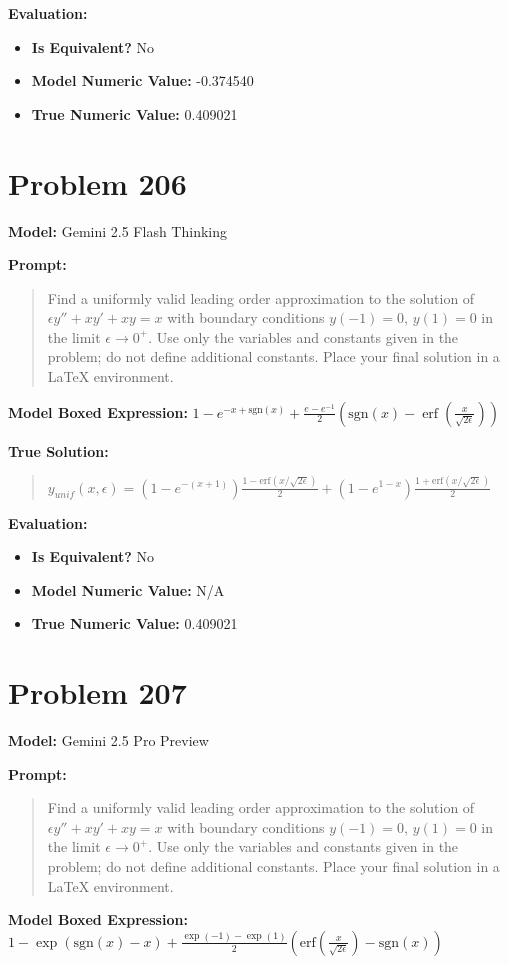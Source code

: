 \documentclass{article}
\begin{document}
{\textbf{Evaluation:}
\begin{itemize}
\item \textbf{Is Equivalent?} No
\item \textbf{Model Numeric Value:} -0.374540
\item \textbf{True Numeric Value:} 0.409021
\end{itemize}
\vspace{1cm}
\section*{Problem 206}
\textbf{Model:} Gemini 2.5 Flash Thinking

\textbf{Prompt:}
\begin{quote}
Find a uniformly valid leading order approximation to the solution of $\epsilon y'' + x y' + x y = x$ with boundary conditions $y(-1) = 0$, $y(1) = 0$ in the limit $\epsilon \to 0^+$. Use only the variables and constants given in the problem; do not define additional constants. Place your final solution in a $\boxed{}$ LaTeX environment.
\end{quote}
\textbf{Model Boxed Expression:} $1-e^{-x+\mathrm{sgn}(x)} + \frac{e-e^{-1}}{2}\left(\mathrm{sgn}(x)-\operatorname{erf}\left(\frac{x}{\sqrt{2\epsilon}}\right)\right)$

\textbf{True Solution:}
\begin{quote}
$y_{unif}(x, \epsilon) = \left(1 - e^{-(x+1)}\right) \frac{1-\text{erf}(x/\sqrt{2\epsilon})}{2} + \left(1 - e^{1-x}\right) \frac{1+\text{erf}(x/\sqrt{2\epsilon})}{2}$
\end{quote}

\textbf{Evaluation:}
\begin{itemize}
\item \textbf{Is Equivalent?} No
\item \textbf{Model Numeric Value:} N/A
\item \textbf{True Numeric Value:} 0.409021
\end{itemize}
\vspace{1cm}
\section*{Problem 207}
\textbf{Model:} Gemini 2.5 Pro Preview

\textbf{Prompt:}
\begin{quote}
Find a uniformly valid leading order approximation to the solution of $\epsilon y'' + x y' + x y = x$ with boundary conditions $y(-1) = 0$, $y(1) = 0$ in the limit $\epsilon \to 0^+$. Use only the variables and constants given in the problem; do not define additional constants. Place your final solution in a $\boxed{}$ LaTeX environment.
\end{quote}
\textbf{Model Boxed Expression:} $1-\exp(\mathrm{sgn}(x)-x) + \frac{\exp(-1)-\exp(1)}{2}\left(\mathrm{erf}\left(\frac{x}{\sqrt{2\epsilon}}\right) - \mathrm{sgn}(x)\right)$

}
\end{document}
